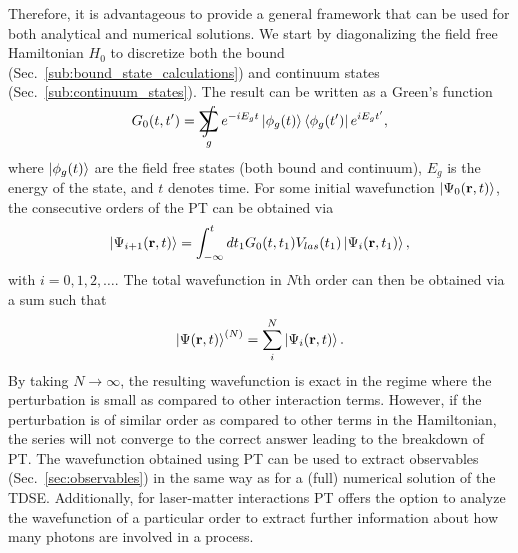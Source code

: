 Therefore, it is advantageous to provide a general framework that can be used for both analytical and numerical solutions. We start by diagonalizing the field free Hamiltonian $H_0$ to discretize both the bound (Sec.~\ref{sub:bound_state_calculations}) and continuum states (Sec.~\ref{sub:continuum_states}). The result can be written as a Green's function 
\begin{equation}
\label{eq:pt_green_func}
    G_0(t,t') = \SumInt_g e^{-iE_g t}\ket{\phi_g(t)}\bra{\phi_g(t')} e^{iE_g t'},
\end{equation}
where $\ket{\phi_g(t)}$ are the field free states (both bound and continuum), $E_g$ is the energy of the state, and $t$ denotes time. For some initial wavefunction $\ket{\Psi_0(\mathbf{r},t)}$, the consecutive orders of the PT can be obtained via
\begin{equation}
    \ket{\Psi_{i+1}(\mathbf{r},t)} = \int_{-\infty}^t dt_1 G_0(t,t_1)V_{las}(t_1)\ket{\Psi_i(\mathbf{r},t_1)}, 
\end{equation}
with $i = 0, 1, 2, \ldots$.
The total wavefunction in $N$th order can then be obtained via a sum such that 
\begin{equation}
    \ket{\Psi(\mathbf{r},t)}^{(N)} = \sum_i^N \ket{\Psi_{i}(\mathbf{r},t)}.
\end{equation}
By taking $N \rightarrow \infty$, the resulting wavefunction is exact in the regime where the perturbation is small as compared to other interaction terms. However, if the perturbation is of similar order as compared to other terms in the Hamiltonian, the series will not converge to the correct answer leading to the breakdown of PT. The wavefunction obtained using PT can be used to extract observables (Sec.~\ref{sec:observables}) in the same way as for a (full) numerical solution of the TDSE. Additionally, for laser-matter interactions PT offers the option to analyze the wavefunction of a particular order to extract further information about how many photons are involved in a process. 

